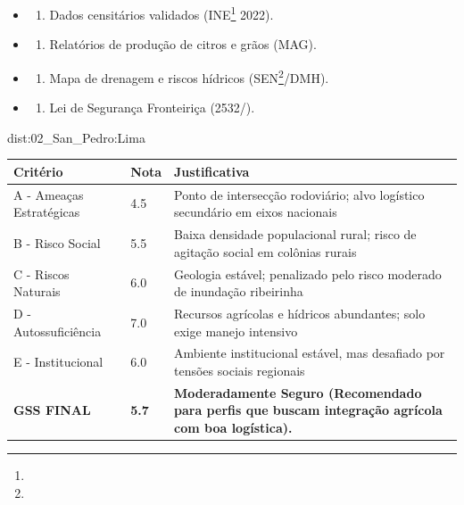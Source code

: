{\begin{itemize}
\tightlist
\item
  \begin{enumerate}
  \def\labelenumi{\arabic{enumi})}
  \tightlist
  \item
    Dados censitários validados (INE\footnote{\fineINE} 2022).
  \end{enumerate}
\item
  \begin{enumerate}
  \def\labelenumi{\arabic{enumi})}
  \setcounter{enumi}{1}
  \tightlist
  \item
    Relatórios de produção de citros e grãos (MAG).
  \end{enumerate}
\item
  \begin{enumerate}
  \def\labelenumi{\arabic{enumi})}
  \setcounter{enumi}{2}
  \tightlist
  \item
    Mapa de drenagem e riscos hídricos (SEN\footnote{\fineSEN}/\allowbreak DMH).
  \end{enumerate}
\item
  \begin{enumerate}
  \def\labelenumi{\arabic{enumi})}
  \setcounter{enumi}{3}
  \tightlist
  \item
    Lei de Segurança Fronteiriça (2532/).
  \end{enumerate}
\end{itemize}}{dist:02_San_Pedro:Lima}
\begin{table}[ht!]
\small \begin{tabular}{p{3.0cm}p{0.8cm}p{6.0cm}} \toprule
\textbf{Critério} & \textbf{Nota} & \textbf{Justificativa} \\ \midrule
A - Ameaças Estratégicas & 4.5 & Ponto de intersecção rodoviário; alvo logístico secundário em eixos nacionais \\
B - Risco Social & 5.5 & Baixa densidade populacional rural; risco de agitação social em colônias rurais \\
C - Riscos Naturais & 6.0 & Geologia estável; penalizado pelo risco moderado de inundação ribeirinha \\
D - Autossuficiência & 7.0 & Recursos agrícolas e hídricos abundantes; solo exige manejo intensivo \\
E - Institucional & 6.0 & Ambiente institucional estável, mas desafiado por tensões sociais regionais \\
\midrule \textbf{GSS FINAL} & \textbf{5.7} & \textbf{Moderadamente Seguro (Recomendado para perfis que buscam integração agrícola com boa logística).} \\ \bottomrule \end{tabular}
\end{table}
